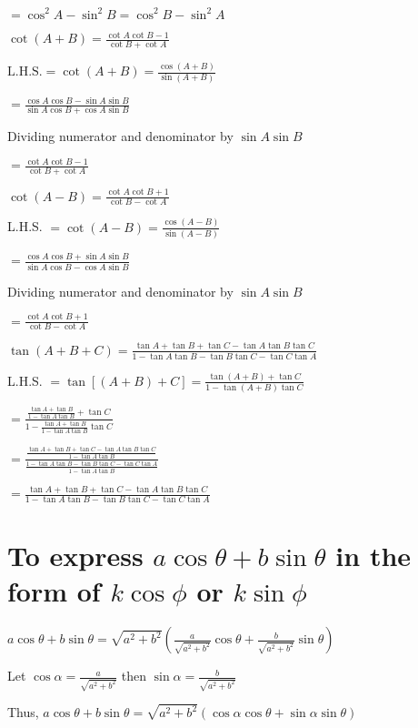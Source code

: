   $= \cos^2A - \sin^2B = \cos^2B - \sin^2A$

\item $\cot(A + B) = \frac{\cot A\cot B - 1}{\cot B + \cot A}$

  $\text{L.H.S.} = \cot(A + B) = \frac{\cos(A + B)}{\sin(A + B)}$

  $= \frac{\cos A\cos B - \sin A\sin B}{\sin A\cos B + \cos A\sin B}$

  Dividing numerator and denominator by $\sin A\sin B$

  $= \frac{\cot A\cot B - 1}{\cot B + \cot A}$

\item $\cot(A - B) = \frac{\cot A\cot B + 1}{\cot B - \cot A}$

  L.H.S. $= \cot(A - B) = \frac{\cos(A - B)}{\sin(A - B)}$

  $= \frac{\cos A\cos B + \sin A\sin B}{\sin A\cos B - \cos A\sin B}$

  Dividing numerator and denominator by $\sin A\sin B$

  $= \frac{\cot A\cot B + 1}{\cot B - \cot A}$

\item $\tan(A + B + C) = \frac{\tan A + \tan B + \tan C - \tan A\tan B\tan C}{1 - \tan A\tan B - \tan B\tan C - \tan C\tan A}$

   L.H.S. $= \tan[(A + B) + C] = \frac{\tan(A + B) + \tan C}{1 - \tan(A + B)\tan C}$

   $= \frac{\frac{\tan A + \tan B}{1 - \tan A\tan B} + \tan C}{1 - \frac{\tan A + \tan B}{1 - \tan A\tan B}\tan C}$

   $= \frac{\frac{\tan A + \tan B + \tan C - \tan A\tan B\tan C}{1 - \tan A\tan B}}{\frac{1 - \tan A\tan B - \tan B\tan C -
   \tan C\tan A}{1 - \tan A\tan B}}$

   $= \frac{\tan A + \tan B + \tan C - \tan A\tan B\tan C}{1 - \tan A\tan B - \tan B\tan C - \tan C\tan A}$
\stopitemize

\section{To express $a\cos\theta + b\sin\theta$ in the form of $k\cos\phi$ or $k\sin\phi$}
$a\cos\theta + b\sin\theta = \sqrt{a^2 + b^2}\left(\frac{a}{\sqrt{a^2 + b^2}}\cos\theta + \frac{b}{\sqrt{a^2 +
b^2}}\sin\theta\right)$

Let $\cos\alpha = \frac{a}{\sqrt{a^2 + b^2}}$ then $\sin\alpha = \frac{b}{\sqrt{a^2 + b^2}}$

Thus, $a\cos\theta + b\sin\theta = \sqrt{a^2 + b^2}(\cos\alpha\cos\theta + \sin\alpha\sin\theta)$

